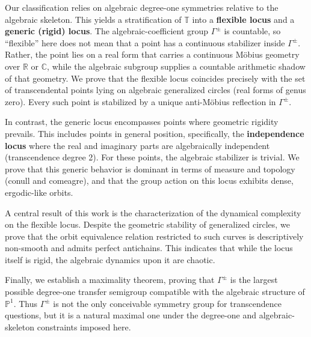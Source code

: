 \documentclass[11pt,a4paper]{article}
\theoremstyle{plain}
\theoremstyle{definition}
\newcommand{\trans}{\mathbb{T}}
\newcommand{\Tc}{\trans}
\begin{document}
Our classification relies on algebraic degree-one symmetries relative to the algebraic skeleton. This yields a stratification of $\Tc$ into a \textbf{flexible locus} and a \textbf{generic (rigid) locus}. The algebraic-coefficient group $\Gamma^{\pm}$ is countable, so ``flexible'' here does not mean that a point has a continuous stabilizer inside $\Gamma^{\pm}$. Rather, the point lies on a real form that carries a continuous Möbius geometry over $\mathbb{R}$ or $\mathbb{C}$, while the algebraic subgroup supplies a countable arithmetic shadow of that geometry. We prove that the flexible locus coincides precisely with the set of transcendental points lying on algebraic generalized circles (real forms of genus zero). Every such point is stabilized by a unique anti-Möbius reflection in $\Gamma^{\pm}$.

In contrast, the generic locus encompasses points where geometric rigidity prevails. This includes points in general position, specifically, the \textbf{independence locus} where the real and imaginary parts are algebraically independent (transcendence degree 2). For these points, the algebraic stabilizer is trivial. We prove that this generic behavior is dominant in terms of measure and topology (conull and comeagre), and that the group action on this locus exhibits dense, ergodic-like orbits.

A central result of this work is the characterization of the dynamical complexity on the flexible locus. Despite the geometric stability of generalized circles, we prove that the orbit equivalence relation restricted to such curves is descriptively non-smooth and admits perfect antichains. This indicates that while the locus itself is rigid, the algebraic dynamics upon it are chaotic.

Finally, we establish a maximality theorem, proving that $\Gamma^{\pm}$ is the largest possible degree-one transfer semigroup compatible with the algebraic structure of $\mathbb{P}^1$. Thus $\Gamma^{\pm}$ is not the only conceivable symmetry group for transcendence questions, but it is a natural maximal one under the degree-one and algebraic-skeleton constraints imposed here.

\end{document}
